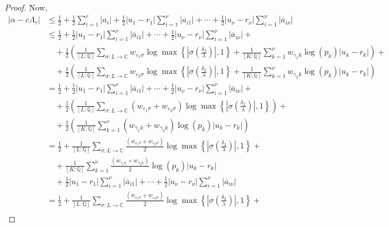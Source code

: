 \begin{proof}
Now, 
\begin{align*}
|\alpha-c\Lambda_\tau| 
	& \leq \frac{1}{2} + \frac{1}{2}\sum_{i = 1}^r |a_i| + \frac{1}{2}|u_1-r_1|\sum_{i=1}^{\nu}|\overline{a}_{i1}| + \cdots + \frac{1}{2}|u_{\nu} - r_{\nu}| \sum_{i=1}^{\nu}|\overline{a}_{i\nu}| \\
	& \leq \frac{1}{2} + \frac{1}{2}|u_1-r_1|\sum_{i=1}^{\nu}|\overline{a}_{i1}| + \cdots + \frac{1}{2}|u_{\nu} - r_{\nu}| \sum_{i=1}^{\nu}|\overline{a}_{i\nu}| + \\
	& \quad + \frac{1}{2}\left(\frac{1}{[L:\mathbb{Q}]}\sum_{\sigma :L \to \mathbb{C}} w_{\varepsilon_1 \sigma}\log \max \left\{ \left|\sigma\left(\frac{\delta_2}{\lambda}\right)\right|, 1\right\} + \frac{1}{[K:\mathbb{Q}]}\sum_{k = 1}^{\nu} w_{\gamma_1 k}\log(p_k)|u_k - r_k| \right) + \\
	&\quad + \frac{1}{2}\left(\frac{1}{[L:\mathbb{Q}]}\sum_{\sigma :L \to \mathbb{C}} w_{\varepsilon_2 \sigma}\log \max \left\{ \left|\sigma\left(\frac{\delta_2}{\lambda}\right)\right|, 1\right\} + \frac{1}{[K:\mathbb{Q}]}\sum_{k = 1}^{\nu} w_{\gamma_2 k}\log(p_k)|u_k - r_k| \right) \\
	& = \frac{1}{2} + \frac{1}{2}|u_1-r_1|\sum_{i=1}^{\nu}|\overline{a}_{i1}| + \cdots + \frac{1}{2}|u_{\nu} - r_{\nu}| \sum_{i=1}^{\nu}|\overline{a}_{i\nu}| + \\
	& \quad + \frac{1}{2}\left(\frac{1}{[L:\mathbb{Q}]}\sum_{\sigma :L \to \mathbb{C}} (w_{\varepsilon_1 \sigma} + w_{\varepsilon_2 \sigma})\log \max \left\{ \left|\sigma\left(\frac{\delta_2}{\lambda}\right)\right|, 1\right\}\right) + \\
	&\quad + \frac{1}{2}\left(\frac{1}{[K:\mathbb{Q}]}\sum_{k = 1}^{\nu} (w_{\gamma_1 k} + w_{\gamma_2 k})\log(p_k)|u_k - r_k| \right) \\
	& = \frac{1}{2} + \frac{1}{[L:\mathbb{Q}]}\sum_{\sigma :L \to \mathbb{C}} \frac{(w_{\varepsilon_1 \sigma} + w_{\varepsilon_2 \sigma})}{2}\log \max \left\{ \left|\sigma\left(\frac{\delta_2}{\lambda}\right)\right|, 1\right\} + \\
	&\quad + \frac{1}{[K:\mathbb{Q}]}\sum_{k = 1}^{\nu} \frac{(w_{\gamma_1 k} + w_{\gamma_2 k})}{2}\log(p_k)|u_k - r_k| \\
	& \quad + \frac{1}{2}|u_1-r_1|\sum_{i=1}^{\nu}|\overline{a}_{i1}| + \cdots + \frac{1}{2}|u_{\nu} - r_{\nu}| \sum_{i=1}^{\nu}|\overline{a}_{i\nu}|\\
	& = \frac{1}{2} + \frac{1}{[L:\mathbb{Q}]}\sum_{\sigma :L \to \mathbb{C}} \frac{(w_{\varepsilon_1 \sigma} + w_{\varepsilon_2 \sigma})}{2}\log \max \left\{ \left|\sigma\left(\frac{\delta_2}{\lambda}\right)\right|, 1\right\} + \\

\end{align*}
\end{proof}

